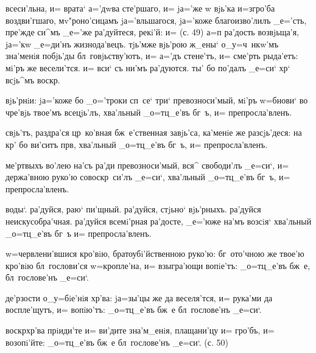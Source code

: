 всеси'льна, и= врата` а='дwва сте'ршаго, и= jа='же w\т 
вjь'ка и=з\ъ гро'ба воздви'гшаго, мv"роно'сицамъ 
jа='вльшагося, jа='коже благоизво'лилъ _е='сть, пре'жде 
си^мъ _е='же ра'дуйтеся, рекi'й: и= (с. 49)  а=п 
ра'дость возвjьща'я, jа='кw _е=ди'нъ жизнода'вецъ. 
тjь'мже вjь'рою ж_ены` о_у=ч~нкw'мъ зна'менiя побjь'ды 
бл~говjьству'ютъ, и= а='дъ стене'тъ, и= сме'рть рыда'етъ: 
мi'ръ же весели'тся. и= вси` съ ни'мъ ра'дуются. ты' бо 
по'далъ _е=си` хр` всjь^мъ воскр.


вjь'рнiи: jа='коже бо _о='троки сп~се` три` 
превозноси'мый, мi'ръ w=бнови` во чре'вjь твое'мъ 
всецjь'лъ, хва'льный _о=тц_е'въ бг~ъ, и= препросла'вленъ.

свjь'тъ, раздра'ся цр~ко'вная бж~е'ственная завjь'са, 
ка'менiе же разсjь'деся: на кр' бо ви'ситъ прв, 
хва'льный _о=тц_е'въ бг~ъ, и= препросла'вленъ.

ме'ртвыхъ во'лею на'съ ра'ди превозноси'мый, вся^ 
свободи'лъ _е=си`, и= держа'вною руко'ю совоскр~си'лъ 
_е=си`, хва'льный _о=тц_е'въ бг~ъ, и= препросла'вленъ.

воды`. ра'дуйся, раю` пи'щный. ра'дуйся, стjьно` 
вjь'рныхъ. ра'дуйся неискусобра'чная. ра'дуйся всемi'рная 
ра'досте, _е='юже на'мъ возсiя` хва'льный _о=тц_е'въ бг~ъ 
и= препросла'вленъ.


w=червлени'вшися кро'вiю, братоубi'йственною руко'ю: 
бг~ото'чною же твое'ю кро'вiю бл~гослови'ся w=кропле'на, 
и= взыгра'ющи вопiе'тъ: _о=тц_е'въ бж~е, бл~гослове'нъ 
_е=си`.

де'рзости о_у=бiе'нiя хр'ва: jа=зы'цы же да 
веселя'тся, и= рука'ми да воспле'щутъ, и= вопiю'тъ: 
_о=тц_е'въ бж~е бл~гослове'нъ _е=си`.

воскр хр'ва прiиди'те и= ви'дите зна'м_енiя, 
плащани'цу и= гро'бъ, и= возопi'йте: _о=тц_е'въ бж~е 
бл~гослове'нъ _е=си`. (с. 50)


